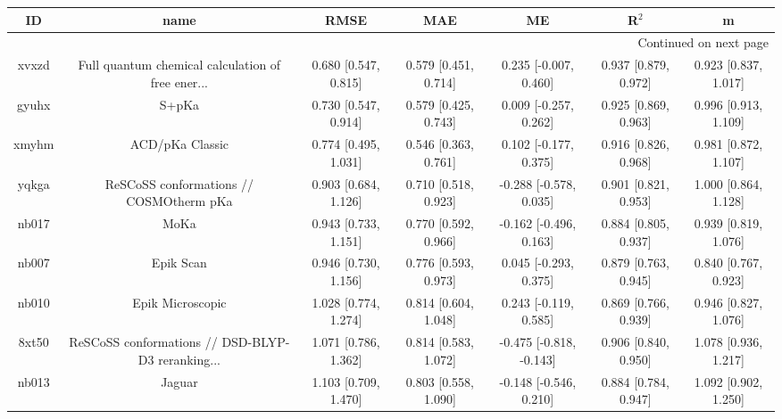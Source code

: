 \documentclass{article}
\begin{document}
\begin{center}
\begin{longtable}{|ccccccc|}
\toprule
    ID &                                               name &                  RMSE &                   MAE &                       ME &                 R$^2$ &                      m \\
\midrule
\endhead
\midrule
\multicolumn{7}{r}{{Continued on next page}} \\
\midrule
\endfoot

\bottomrule
\endlastfoot
 xvxzd &  Full quantum chemical calculation of free ener... &  0.680 [0.547, 0.815] &  0.579 [0.451, 0.714] &    0.235 [-0.007, 0.460] &  0.937 [0.879, 0.972] &   0.923 [0.837, 1.017] \\
 gyuhx &                                              S+pKa &  0.730 [0.547, 0.914] &  0.579 [0.425, 0.743] &    0.009 [-0.257, 0.262] &  0.925 [0.869, 0.963] &   0.996 [0.913, 1.109] \\
 xmyhm &                                    ACD/pKa Classic &  0.774 [0.495, 1.031] &  0.546 [0.363, 0.761] &    0.102 [-0.177, 0.375] &  0.916 [0.826, 0.968] &   0.981 [0.872, 1.107] \\
 yqkga &            ReSCoSS conformations // COSMOtherm pKa &  0.903 [0.684, 1.126] &  0.710 [0.518, 0.923] &   -0.288 [-0.578, 0.035] &  0.901 [0.821, 0.953] &   1.000 [0.864, 1.128] \\
 nb017 &                                               MoKa &  0.943 [0.733, 1.151] &  0.770 [0.592, 0.966] &   -0.162 [-0.496, 0.163] &  0.884 [0.805, 0.937] &   0.939 [0.819, 1.076] \\
 nb007 &                                          Epik Scan &  0.946 [0.730, 1.156] &  0.776 [0.593, 0.973] &    0.045 [-0.293, 0.375] &  0.879 [0.763, 0.945] &   0.840 [0.767, 0.923] \\
 nb010 &                                   Epik Microscopic &  1.028 [0.774, 1.274] &  0.814 [0.604, 1.048] &    0.243 [-0.119, 0.585] &  0.869 [0.766, 0.939] &   0.946 [0.827, 1.076] \\
 8xt50 &  ReSCoSS conformations // DSD-BLYP-D3 reranking... &  1.071 [0.786, 1.362] &  0.814 [0.583, 1.072] &  -0.475 [-0.818, -0.143] &  0.906 [0.840, 0.950] &   1.078 [0.936, 1.217] \\
 nb013 &                                             Jaguar &  1.103 [0.709, 1.470] &  0.803 [0.558, 1.090] &   -0.148 [-0.546, 0.210] &  0.884 [0.784, 0.947] &   1.092 [0.902, 1.250] \\

\end{longtable}
\end{center}
\end{document}
